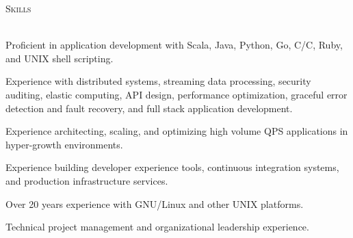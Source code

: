 \documentclass[10pt,letterpaper]{article}
\newcommand{\lineunder}{\vspace*{-8pt} \\ \hspace*{-18pt} \hrulefill \\}
\newcommand{\header}[1]{{\hspace*{-15pt}\vspace*{6pt} \textsc{#1}} \vspace*{-6pt} \lineunder}
\newcommand{\CPP}
{C\nolinebreak[4]\hspace{-.05em}\raisebox{.22ex}{\footnotesize\bf ++}}
\begin{document}
\header{Skills}
\vspace*{-5pt}
\begin{itemize*}
\item Proficient in application development with Scala, Java, Python, Go, C/\CPP, Ruby, and UNIX shell scripting. 
\item Experience with distributed systems, streaming data processing, security auditing, elastic
  computing, API design, performance optimization, graceful error detection and
  fault recovery, and full stack application development.
\item Experience architecting, scaling, and optimizing high volume QPS applications in hyper-growth environments.
\item Experience building developer experience tools, continuous integration
  systems, and production infrastructure services.
\item Over 20 years experience with GNU/Linux and other UNIX platforms.
\item Technical project management and organizational leadership experience.
\end{itemize*}
\vspace*{3pt}
\end{document}
